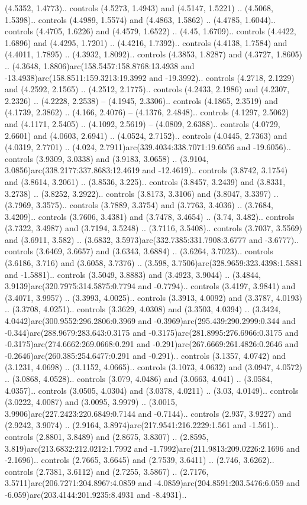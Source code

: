 (4.5352, 1.4773).. controls (4.5273, 1.4943) and (4.5147, 1.5221) .. (4.5068, 1.5398).. controls (4.4989, 1.5574) and (4.4863, 1.5862) .. (4.4785, 1.6044).. controls (4.4705, 1.6226) and (4.4579, 1.6522) .. (4.45, 1.6709).. controls (4.4422, 1.6896) and (4.4295, 1.7201) .. (4.4216, 1.7392).. controls (4.4138, 1.7584) and (4.4011, 1.7895) .. (4.3932, 1.8092).. controls (4.3853, 1.8287) and (4.3727, 1.8605) .. (4.3648, 1.8806)arc(158.5457:158.8768:13.4938 and -13.4938)arc(158.8511:159.3213:19.3992 and -19.3992).. controls (4.2718, 2.1229) and (4.2592, 2.1565) .. (4.2512, 2.1775).. controls (4.2433, 2.1986) and (4.2307, 2.2326) .. (4.2228, 2.2538) -- (4.1945, 2.3306).. controls (4.1865, 2.3519) and (4.1739, 2.3862) .. (4.166, 2.4076) -- (4.1376, 2.4848).. controls (4.1297, 2.5062) and (4.1171, 2.5405) .. (4.1092, 2.5619) -- (4.0809, 2.6388).. controls (4.0729, 2.6601) and (4.0603, 2.6941) .. (4.0524, 2.7152).. controls (4.0445, 2.7363) and (4.0319, 2.7701) .. (4.024, 2.7911)arc(339.4034:338.7071:19.6056 and -19.6056).. controls (3.9309, 3.0338) and (3.9183, 3.0658) .. (3.9104, 3.0856)arc(338.2177:337.8683:12.4619 and -12.4619).. controls (3.8742, 3.1754) and (3.8614, 3.2061) .. (3.8536, 3.225).. controls (3.8457, 3.2439) and (3.8331, 3.2738) .. (3.8252, 3.2922).. controls (3.8173, 3.3106) and (3.8047, 3.3397) .. (3.7969, 3.3575).. controls (3.7889, 3.3754) and (3.7763, 3.4036) .. (3.7684, 3.4209).. controls (3.7606, 3.4381) and (3.7478, 3.4654) .. (3.74, 3.482).. controls (3.7322, 3.4987) and (3.7194, 3.5248) .. (3.7116, 3.5408).. controls (3.7037, 3.5569) and (3.6911, 3.582) .. (3.6832, 3.5973)arc(332.7385:331.7908:3.6777 and -3.6777).. controls (3.6469, 3.6657) and (3.6343, 3.6884) .. (3.6264, 3.7023).. controls (3.6186, 3.716) and (3.6058, 3.7376) .. (3.598, 3.7506)arc(328.9659:323.4398:1.5881 and -1.5881).. controls (3.5049, 3.8883) and (3.4923, 3.9044) .. (3.4844, 3.9139)arc(320.7975:314.5875:0.7794 and -0.7794).. controls (3.4197, 3.9841) and (3.4071, 3.9957) .. (3.3993, 4.0025).. controls (3.3913, 4.0092) and (3.3787, 4.0193) .. (3.3708, 4.0251).. controls (3.3629, 4.0308) and (3.3503, 4.0394) .. (3.3424, 4.0442)arc(300.9552:296.2806:0.3969 and -0.3969)arc(295.439:290.2999:0.344 and -0.344)arc(288.9679:283.643:0.3175 and -0.3175)arc(281.8995:276.6966:0.3175 and -0.3175)arc(274.6662:269.0668:0.291 and -0.291)arc(267.6669:261.4826:0.2646 and -0.2646)arc(260.385:254.6477:0.291 and -0.291).. controls (3.1357, 4.0742) and (3.1231, 4.0698) .. (3.1152, 4.0665).. controls (3.1073, 4.0632) and (3.0947, 4.0572) .. (3.0868, 4.0528).. controls (3.079, 4.0486) and (3.0663, 4.041) .. (3.0584, 4.0357).. controls (3.0505, 4.0304) and (3.0378, 4.0211) .. (3.03, 4.0149).. controls (3.0222, 4.0087) and (3.0095, 3.9979) .. (3.0015, 3.9906)arc(227.2423:220.6849:0.7144 and -0.7144).. controls (2.937, 3.9227) and (2.9242, 3.9074) .. (2.9164, 3.8974)arc(217.9541:216.2229:1.561 and -1.561).. controls (2.8801, 3.8489) and (2.8675, 3.8307) .. (2.8595, 3.819)arc(213.6832:212.0212:1.7992 and -1.7992)arc(211.9813:209.0226:2.1696 and -2.1696).. controls (2.7665, 3.6645) and (2.7539, 3.6411) .. (2.746, 3.6262).. controls (2.7381, 3.6112) and (2.7255, 3.5867) .. (2.7176, 3.5711)arc(206.7271:204.8967:4.0859 and -4.0859)arc(204.8591:203.5476:6.059 and -6.059)arc(203.4144:201.9235:8.4931 and -8.4931).. 